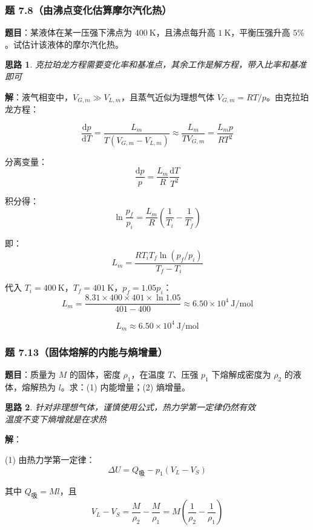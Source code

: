 \documentclass[UTF8]{ctexart}
\newtheorem{thoughts}{思路}[subsection]
\begin{document}
\subsubsection{题 7.8（由沸点变化估算摩尔汽化热）}

\textbf{题目}：某液体在某一压强下沸点为 $400\ \mathrm{K}$，且沸点每升高 $1\ \mathrm{K}$，平衡压强升高 $5\%$。试估计该液体的摩尔汽化热。

\begin{thoughts}
  克拉珀龙方程需要变化率和基准点，其余工作是解方程，带入比率和基准即可
\end{thoughts}

\textbf{解}：液气相变中，$V_{G,m}\gg V_{L,m}$，且蒸气近似为理想气体 $V_{G,m}=RT/p$。由克拉珀龙方程：

\[
\frac{\mathrm{d}p}{\mathrm{d}T}
=\frac{L_m}{T(V_{G,m}-V_{L,m})}
\approx\frac{L_m}{TV_{G,m}}
=\frac{L_m p}{RT^2}
\]

分离变量：
\[
\frac{\mathrm{d}p}{p}=\frac{L_m}{R}\frac{\mathrm{d}T}{T^2}
\]

积分得：
\[
\ln\frac{p_f}{p_i}=\frac{L_m}{R}\left(\frac{1}{T_i}-\frac{1}{T_f}\right)
\]

即：
\[
L_m=\frac{RT_i T_f\ln(p_f/p_i)}{T_f-T_i}
\]

代入 $T_i=400\ \mathrm{K}$，$T_f=401\ \mathrm{K}$，$p_f=1.05p_i$：
\[
L_m=\frac{8.31\times 400\times 401\times\ln 1.05}{401-400}
\approx 6.50\times 10^4\ \mathrm{J/mol}
\]

\[
\boxed{L_m\approx 6.50\times 10^4\ \mathrm{J/mol}}
\]

\subsubsection{题 7.13（固体熔解的内能与熵增量）}

\textbf{题目}：质量为 $M$ 的固体，密度 $\rho_1$，在温度 $T$、压强 $p_1$ 下熔解成密度为 $\rho_2$ 的液体，熔解热为 $l$。求：(1) 内能增量；(2) 熵增量。

\begin{thoughts}
  针对非理想气体，谨慎使用公式，热力学第一定律仍然有效\\
  温度不变下熵增就是在求热
\end{thoughts}

\textbf{解}：

(1) 由热力学第一定律：
\[
\Delta U=Q_{\text{吸}}-p_1(V_L-V_S)
\]

其中 $Q_{\text{吸}}=Ml$，且
\[
V_L-V_S=\frac{M}{\rho_2}-\frac{M}{\rho_1}
=M\left(\frac{1}{\rho_2}-\frac{1}{\rho_1}\right)
\]
\end{document}
